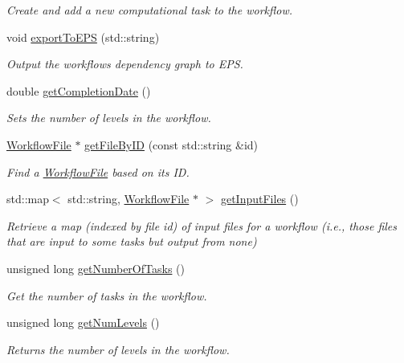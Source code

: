 \begin{DoxyCompactItemize}
\begin{DoxyCompactList}\small\item\em Create and add a new computational task to the workflow. \end{DoxyCompactList}\item 
void \hyperlink{classwrench_1_1_workflow_a73a5f2898f4fdda4cb38933c2c485b28}{export\+To\+E\+PS} (std\+::string)
\begin{DoxyCompactList}\small\item\em Output the workflow\textquotesingle{}s dependency graph to E\+PS. \end{DoxyCompactList}\item 
double \hyperlink{classwrench_1_1_workflow_ac3a1291469d2c0035352a99f0f964f3f}{get\+Completion\+Date} ()
\begin{DoxyCompactList}\small\item\em Sets the number of levels in the workflow. \end{DoxyCompactList}\item 
\hyperlink{classwrench_1_1_workflow_file}{Workflow\+File} $\ast$ \hyperlink{classwrench_1_1_workflow_a19b3b6f36f684f8c367f42a818b0a0c2}{get\+File\+By\+ID} (const std\+::string \&id)
\begin{DoxyCompactList}\small\item\em Find a \hyperlink{classwrench_1_1_workflow_file}{Workflow\+File} based on its ID. \end{DoxyCompactList}\item 
std\+::map$<$ std\+::string, \hyperlink{classwrench_1_1_workflow_file}{Workflow\+File} $\ast$ $>$ \hyperlink{classwrench_1_1_workflow_aa0b88cee8316ed20def3010c92a6d69c}{get\+Input\+Files} ()
\begin{DoxyCompactList}\small\item\em Retrieve a map (indexed by file id) of input files for a workflow (i.\+e., those files that are input to some tasks but output from none) \end{DoxyCompactList}\item 
unsigned long \hyperlink{classwrench_1_1_workflow_ab2b98a21d67824c2fc17cdc71c7e3909}{get\+Number\+Of\+Tasks} ()
\begin{DoxyCompactList}\small\item\em Get the number of tasks in the workflow. \end{DoxyCompactList}\item 
unsigned long \hyperlink{classwrench_1_1_workflow_a15f12b7d5088e8e1e2130545c2b795ea}{get\+Num\+Levels} ()
\begin{DoxyCompactList}\small\item\em Returns the number of levels in the workflow. \end{DoxyCompactList}\item 

\end{DoxyCompactItemize}
